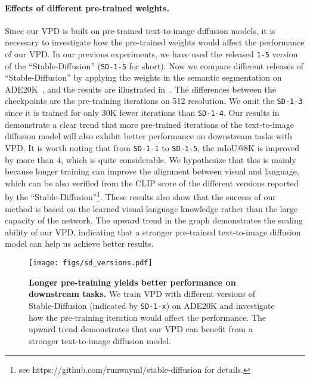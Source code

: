\documentclass[10pt,twocolumn,letterpaper]{article}
\newcommand{\epstheta}{}
\begin{document}
\vspace{-10pt}

\paragraph{Effects of different pre-trained weights.} Since our VPD is built on pre-trained text-to-image diffusion models, it is necessary to investigate how the pre-trained weights would affect the performance of our VPD. In our previous experiments, we have used the released \texttt{1-5} version of the ``Stable-Diffusion'' (\texttt{SD-1-5} for short). Now we compare different releases of ``Stable-Diffusion'' by applying the weights in the semantic segmentation on ADE20K~\cite{zhou2017ade}, and the results are illustrated in~. The differences between the checkpoints are the pre-training iterations on 512 resolution. We omit the \texttt{SD-1-3} since it is trained for only 30K fewer iterations than \texttt{SD-1-4}. Our results in~ demonstrate a clear trend that more pre-trained iterations of the text-to-image diffusion model will also exhibit better performance on downstream tasks with VPD. It is worth noting that from \texttt{SD-1-1} to \texttt{SD-1-5}, the mIoU@8K is improved by more than 4, which is quite considerable. We hypothesize that this is mainly because longer training can improve the alignment between visual and language, which can be also verified from the CLIP score of the different versions reported by the ``Stable-Diffusion''\footnote{see https://github.com/runwayml/stable-diffusion for details.}. These results also show that the success of our method is based on the learned visual-language knowledge rather than the large capacity of the \epstheta{} network. The upward trend in the graph demonstrates the scaling ability of our VPD, indicating that a stronger pre-trained text-to-image diffusion model can help us achieve better results.


\begin{figure}[t]
    \centering
    \texttt{[image: figs/sd\_versions.pdf]}
    \caption{\textbf{Longer pre-training yields better performance on downstream tasks.} We train VPD with different versions of Stable-Diffusion (indicated by \texttt{SD-1-x}) on ADE20K and investigate how the pre-training iteration would affect the performance. The upward trend demonstrates that our VPD can benefit from a stronger text-to-image diffusion model.}
    \label{fig:sd_version}
    \vspace{-12pt}
\end{figure}
\end{document}
